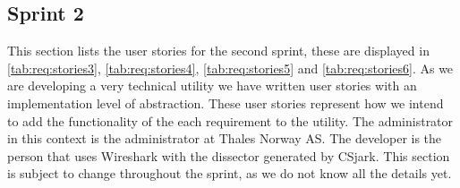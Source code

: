 \subsection{Sprint 2}

This section lists the user stories for the second sprint, these are displayed in \autoref{tab:req:stories3}, \autoref{tab:req:stories4},
\autoref{tab:req:stories5} and \autoref{tab:req:stories6}.
As we are developing a very technical utility we have written user stories with an implementation level of abstraction. 
These user stories represent how we intend to add the functionality of the each requirement to the utility.
The administrator in this context is the administrator at Thales Norway AS. 
The developer is the person that uses Wireshark with the dissector generated by CSjark.
This section is subject to change throughout the sprint, as we do not know all the details yet.


